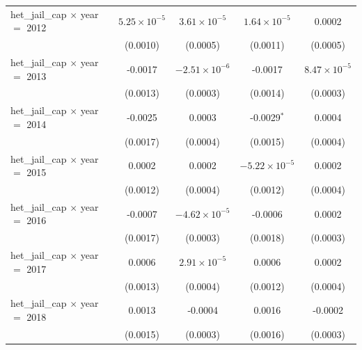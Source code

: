 \begin{tabular}{lcccc}
   het\_jail\_cap $\times$ year $=$ 2012                & $5.25\times 10^{-5}$  & $3.61\times 10^{-5}$      & $1.64\times 10^{-5}$   & 0.0002\\   
                                                        & (0.0010)              & (0.0005)                  & (0.0011)               & (0.0005)\\   
   het\_jail\_cap $\times$ year $=$ 2013                & -0.0017               & $-2.51\times 10^{-6}$     & -0.0017                & $8.47\times 10^{-5}$\\    
                                                        & (0.0013)              & (0.0003)                  & (0.0014)               & (0.0003)\\   
   het\_jail\_cap $\times$ year $=$ 2014                & -0.0025               & 0.0003                    & -0.0029$^{*}$          & 0.0004\\   
                                                        & (0.0017)              & (0.0004)                  & (0.0015)               & (0.0004)\\   
   het\_jail\_cap $\times$ year $=$ 2015                & 0.0002                & 0.0002                    & $-5.22\times 10^{-5}$  & 0.0002\\   
                                                        & (0.0012)              & (0.0004)                  & (0.0012)               & (0.0004)\\   
   het\_jail\_cap $\times$ year $=$ 2016                & -0.0007               & $-4.62\times 10^{-5}$     & -0.0006                & 0.0002\\   
                                                        & (0.0017)              & (0.0003)                  & (0.0018)               & (0.0003)\\   
   het\_jail\_cap $\times$ year $=$ 2017                & 0.0006                & $2.91\times 10^{-5}$      & 0.0006                 & 0.0002\\   
                                                        & (0.0013)              & (0.0004)                  & (0.0012)               & (0.0004)\\   
   het\_jail\_cap $\times$ year $=$ 2018                & 0.0013                & -0.0004                   & 0.0016                 & -0.0002\\   
                                                        & (0.0015)              & (0.0003)                  & (0.0016)               & (0.0003)\\   

\end{tabular}
